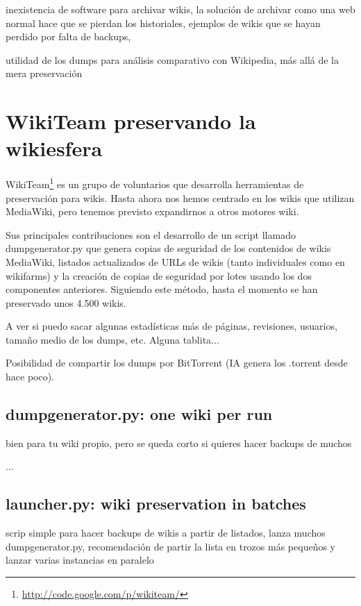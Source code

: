 \documentclass[11pt,twocolumn]{article}
\begin{document}
inexistencia de software para archivar wikis, la solución de archivar como una web normal hace que se pierdan los historiales, ejemplos de wikis que se hayan perdido por falta de backups, 

utilidad de los dumps para análisis comparativo con Wikipedia, más allá de la mera preservación

\section{WikiTeam preservando la wikiesfera}

WikiTeam\footnote{\href{http://code.google.com/p/wikiteam/}{http://code.google.com/p/wikiteam/}} es un grupo de voluntarios que desarrolla herramientas de preservación para wikis. Hasta ahora nos hemos centrado en los wikis que utilizan MediaWiki, pero tenemos previsto expandirnos a otros motores wiki.

Sus principales contribuciones son el desarrollo de un script llamado dumpgenerator.py que genera copias de seguridad de los contenidos de wikis MediaWiki, listados actualizados de URLs de wikis (tanto individuales como en wikifarms) y la creación de copias de seguridad por lotes usando los dos componentes anteriores. Siguiendo este método, hasta el momento se han preservado unos 4.500 wikis.

A ver si puedo sacar algunas estadísticas más de páginas, revisiones, usuarios, tamaño medio de los dumps, etc. Alguna tablita...

Posibilidad de compartir los dumps por BitTorrent (IA genera los .torrent desde hace poco).

\subsection{dumpgenerator.py: one wiki per run}

bien para tu wiki propio, pero se queda corto si quieres hacer backups de muchos

...

\subsection{launcher.py: wiki preservation in batches}

scrip simple para hacer backups de wikis a partir de listados, lanza muchos dumpgenerator.py, recomendación de partir la lista en trozos más pequeños y lanzar varias instancias en paralelo
\end{document}
